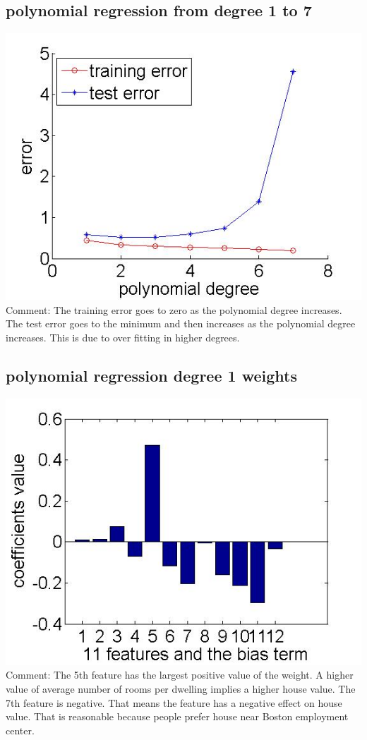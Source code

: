 \documentclass[paper=a4, fontsize=11pt]{article} %
\begin{document}
\subsection{polynomial regression from degree 1 to 7}
\includegraphics[width=\linewidth]{poly_reg.jpg}
Comment: 
The training error goes to zero as the polynomial degree increases.
The test error goes to the minimum and then increases as the polynomial degree increases.
This is due to over fitting in higher degrees.

\subsection{polynomial regression degree 1 weights}
\includegraphics[width=\linewidth]{weights.jpg}
Comment:
The 5th feature has the largest positive value of the weight. A higher value of average number of rooms per dwelling implies a higher house value.
The 7th feature is negative. That means the feature has a negative effect on house value. That is reasonable because people prefer house near Boston employment center.
\end{document}
